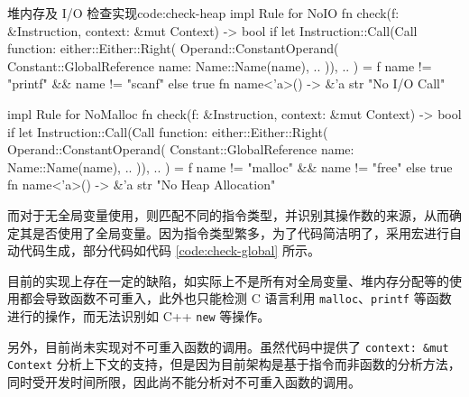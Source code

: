 \documentclass[a4paper, 12pt]{article} %
\newcounter{code}
\numberwithin{equation}{section}
\begin{document}
\begin{code}{堆内存及 I/O 检查实现}{code:check-heap}
  impl Rule for NoIO {
    fn check(f: &Instruction, context: &mut Context) -> bool {
      if let Instruction::Call(Call {
        function:
          either::Either::Right(
          Operand::ConstantOperand(
            Constant::GlobalReference {
            name: Name::Name(name),
            ..
          })),
        ..
      }) = f
      {
        name != "printf" && name != "scanf"
      } else {
        true
      }
    }
    fn name<'a>() -> &'a str {
      "No I/O Call"
    }
  }

  impl Rule for NoMalloc {
    fn check(f: &Instruction, context: &mut Context) -> bool {
      if let Instruction::Call(Call {
        function:
          either::Either::Right(
          Operand::ConstantOperand(
            Constant::GlobalReference {
            name: Name::Name(name),
            ..
          })),
        ..
      }) = f
      {
        name != "malloc" && name != "free"
      } else {
        true
      }
    }
    fn name<'a>() -> &'a str {
      "No Heap Allocation"
    }
  }
\end{code}

而对于无全局变量使用，则匹配不同的指令类型，并识别其操作数的来源，从而确定其是否使用了全局变量。因为指令类型繁多，为了代码简洁明了，采用宏进行自动代码生成，部分代码如代码 \ref{code:check-global} 所示。


目前的实现上存在一定的缺陷，如实际上不是所有对全局变量、堆内存分配等的使用都会导致函数不可重入，此外也只能检测 C 语言利用 \texttt{malloc}、\texttt{printf} 等函数进行的操作，而无法识别如 C++ \texttt{new} 等操作。

另外，目前尚未实现对不可重入函数的调用。虽然代码中提供了 \lstinline{context: &mut Context} 分析上下文的支持，但是因为目前架构是基于指令而非函数的分析方法，同时受开发时间所限，因此尚不能分析对不可重入函数的调用。
\end{document}
